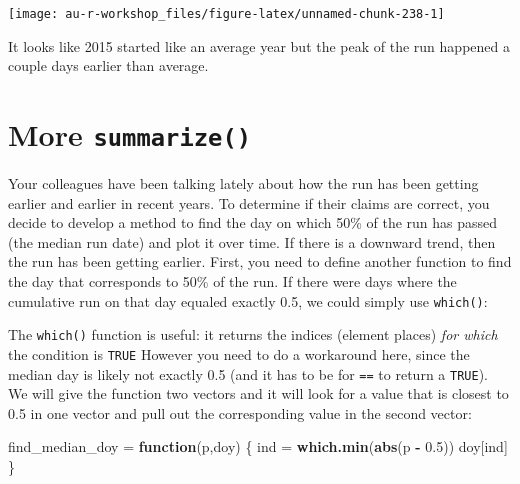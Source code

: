 \documentclass[]{book}
\newenvironment{Shaded}{\begin{snugshade}}{\end{snugshade}}
\newcommand{\KeywordTok}[1]{\textcolor[rgb]{0.13,0.29,0.53}{\textbf{#1}}}
\newcommand{\FloatTok}[1]{\textcolor[rgb]{0.00,0.00,0.81}{#1}}
\newcommand{\StringTok}[1]{\textcolor[rgb]{0.31,0.60,0.02}{#1}}
\newcommand{\ControlFlowTok}[1]{\textcolor[rgb]{0.13,0.29,0.53}{\textbf{#1}}}
\newcommand{\OperatorTok}[1]{\textcolor[rgb]{0.81,0.36,0.00}{\textbf{#1}}}
\newcommand{\NormalTok}[1]{#1}
\theoremstyle{definition}
\theoremstyle{definition}
\theoremstyle{definition}
\theoremstyle{remark}
\begin{document}
\begin{center}\texttt{[image: au-r-workshop\_files/figure-latex/unnamed-chunk-238-1]} \end{center}

It looks like 2015 started like an average year but the peak of the run
happened a couple days earlier than average.

\section{\texorpdfstring{More
\texttt{summarize()}}{More summarize()}}\label{more-summarize}

Your colleagues have been talking lately about how the run has been
getting earlier and earlier in recent years. To determine if their
claims are correct, you decide to develop a method to find the day on
which 50\% of the run has passed (the median run date) and plot it over
time. If there is a downward trend, then the run has been getting
earlier. First, you need to define another function to find the day that
corresponds to 50\% of the run. If there were days where the cumulative
run on that day equaled exactly 0.5, we could simply use
\texttt{which()}:

\begin{Shaded}
\end{Shaded}

The \texttt{which()} function is useful: it returns the indices (element
places) \emph{for which} the condition is \texttt{TRUE} However you need
to do a workaround here, since the median day is likely not exactly 0.5
(and it has to be for \texttt{==} to return a \texttt{TRUE}). We will
give the function two vectors and it will look for a value that is
closest to 0.5 in one vector and pull out the corresponding value in the
second vector:

\begin{Shaded}
\begin{Highlighting}[]
\NormalTok{find_median_doy =}\StringTok{ }\ControlFlowTok{function}\NormalTok{(p,doy) \{}
\NormalTok{  ind =}\StringTok{ }\KeywordTok{which.min}\NormalTok{(}\KeywordTok{abs}\NormalTok{(p }\OperatorTok{-}\StringTok{ }\FloatTok{0.5}\NormalTok{))}
\NormalTok{  doy[ind]}
\NormalTok{\}}
\end{Highlighting}
\end{Shaded}
\end{document}
